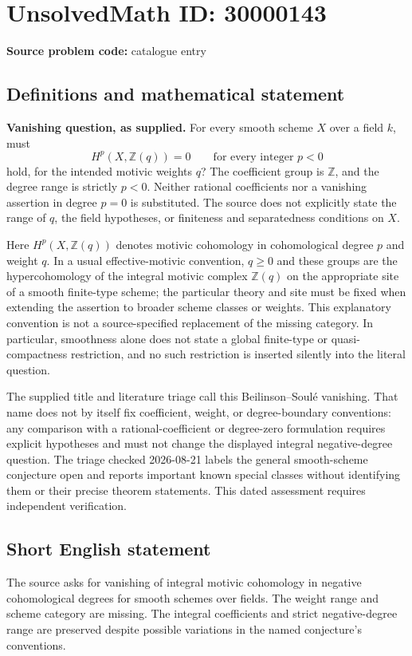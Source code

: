 \documentclass[11pt]{article}
\newcommand{\Z}{\mathbb{Z}}
\begin{document}
\section*{UnsolvedMath ID: 30000143}
\textbf{Source problem code:} catalogue entry
\subsection{Definitions and mathematical statement}
\textbf{Vanishing question, as supplied.} For every smooth scheme \(X\) over a field \(k\), must\[H^p(X,\Z(q))=0\qquad\text{for every integer }p<0\] hold, for the intended motivic weights \(q\)? The coefficient group is \(\Z\), and the degree range is strictly \(p<0\). Neither rational coefficients nor a vanishing assertion in degree \(p=0\) is substituted. The source does not explicitly state the range of \(q\), the field hypotheses, or finiteness and separatedness conditions on \(X\).\par Here \(H^p(X,\Z(q))\) denotes motivic cohomology in cohomological degree \(p\) and weight \(q\). In a usual effective-motivic convention, \(q\ge0\) and these groups are the hypercohomology of the integral motivic complex \(\Z(q)\) on the appropriate site of a smooth finite-type scheme; the particular theory and site must be fixed when extending the assertion to broader scheme classes or weights. This explanatory convention is not a source-specified replacement of the missing category. In particular, smoothness alone does not state a global finite-type or quasi-compactness restriction, and no such restriction is inserted silently into the literal question.\par The supplied title and literature triage call this Beilinson--Soul\'e vanishing. That name does not by itself fix coefficient, weight, or degree-boundary conventions: any comparison with a rational-coefficient or degree-zero formulation requires explicit hypotheses and must not change the displayed integral negative-degree question. The triage checked 2026-08-21 labels the general smooth-scheme conjecture open and reports important known special classes without identifying them or their precise theorem statements. This dated assessment requires independent verification.
\subsection{Short English statement}
The source asks for vanishing of integral motivic cohomology in negative cohomological degrees for smooth schemes over fields. The weight range and scheme category are missing. The integral coefficients and strict negative-degree range are preserved despite possible variations in the named conjecture's conventions.
\end{document}
